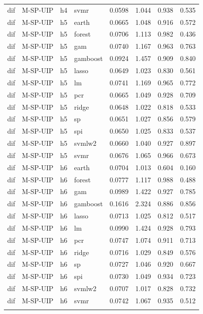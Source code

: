 \begin{ThreePartTable}
\begin{longtable}[t]{llclcccc}
dif & M-SP-UIP & h4 & svmr & 0.0598 & 1.044 & 0.938 & 0.535\\
\addlinespace
dif & M-SP-UIP & h5 & earth & 0.0665 & 1.048 & 0.916 & 0.572\\
dif & M-SP-UIP & h5 & forest & 0.0706 & 1.113 & 0.982 & 0.436\\
dif & M-SP-UIP & h5 & gam & 0.0740 & 1.167 & 0.963 & 0.763\\
dif & M-SP-UIP & h5 & gamboost & 0.0924 & 1.457 & 0.909 & 0.840\\
dif & M-SP-UIP & h5 & lasso & 0.0649 & 1.023 & 0.830 & 0.561\\
dif & M-SP-UIP & h5 & lm & 0.0741 & 1.169 & 0.965 & 0.772\\
dif & M-SP-UIP & h5 & pcr & 0.0665 & 1.049 & 0.928 & 0.709\\
dif & M-SP-UIP & h5 & ridge & 0.0648 & 1.022 & 0.818 & 0.533\\
dif & M-SP-UIP & h5 & sp & 0.0651 & 1.027 & 0.856 & 0.579\\
dif & M-SP-UIP & h5 & spi & 0.0650 & 1.025 & 0.833 & 0.537\\
dif & M-SP-UIP & h5 & svmlw2 & 0.0660 & 1.040 & 0.927 & 0.897\\
dif & M-SP-UIP & h5 & svmr & 0.0676 & 1.065 & 0.966 & 0.673\\
\addlinespace
dif & M-SP-UIP & h6 & earth & 0.0704 & 1.013 & 0.604 & 0.160\\
dif & M-SP-UIP & h6 & forest & 0.0777 & 1.117 & 0.988 & 0.488\\
dif & M-SP-UIP & h6 & gam & 0.0989 & 1.422 & 0.927 & 0.785\\
dif & M-SP-UIP & h6 & gamboost & 0.1616 & 2.324 & 0.886 & 0.856\\
dif & M-SP-UIP & h6 & lasso & 0.0713 & 1.025 & 0.812 & 0.517\\
dif & M-SP-UIP & h6 & lm & 0.0990 & 1.424 & 0.928 & 0.793\\
dif & M-SP-UIP & h6 & pcr & 0.0747 & 1.074 & 0.911 & 0.713\\
dif & M-SP-UIP & h6 & ridge & 0.0716 & 1.029 & 0.849 & 0.576\\
dif & M-SP-UIP & h6 & sp & 0.0727 & 1.046 & 0.920 & 0.667\\
dif & M-SP-UIP & h6 & spi & 0.0730 & 1.049 & 0.934 & 0.723\\
dif & M-SP-UIP & h6 & svmlw2 & 0.0707 & 1.017 & 0.828 & 0.732\\
dif & M-SP-UIP & h6 & svmr & 0.0742 & 1.067 & 0.935 & 0.512\\
\addlinespace

\end{longtable}
\end{ThreePartTable}
